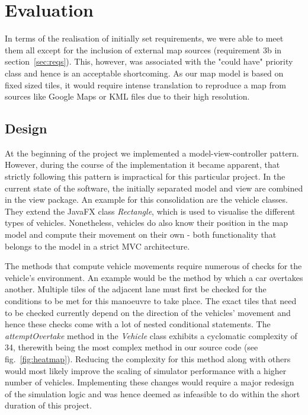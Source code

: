 \section{Evaluation}
\label{ss:eval_sim}
In terms of the realisation of initially set requirements, we were able to meet them all except for the inclusion of external map sources (requirement 3b in section~\ref{sec:reqs}). This, however, was associated with the "could have" priority class and hence is an acceptable shortcoming. As our map model is based on fixed sized tiles, it would require intense translation to reproduce a map from sources like Google Maps or KML files due to their high resolution. 

\subsection*{Design}
At the beginning of the project we implemented a model-view-controller pattern. However, during the course of the implementation it became apparent, that strictly following this pattern is impractical for this particular project. In the current state of the software, the initially separated model and view are combined in the view package. An example for this consolidation are the vehicle classes. They extend the JavaFX class \textit{Rectangle}, which is used to visualise the different types of vehicles. Nonetheless, vehicles do also know their position in the map model and compute their movement on their own - both functionality that belongs to the model in a strict MVC architecture.

The methods that compute vehicle movements require numerous of checks for the vehicle's environment. An example would be the method by which a car overtakes another. Multiple tiles of the adjacent lane must first be checked for the conditions to be met for this manoeuvre to take place. The exact tiles that need to be checked currently depend on the direction of the vehicles' movement and hence these checks come with a lot of nested conditional statements. The \textit{attemptOvertake} method in the \textit{Vehicle} class exhibits a cyclomatic complexity of 34, therewith being the most complex method in our source code (see fig.~\ref{fig:heatmap}). Reducing the complexity for this method along with others would most likely improve the scaling of simulator performance with a higher number of vehicles. Implementing these changes would require a major redesign of the simulation logic and was hence deemed as infeasible to do within the short duration of this project.

